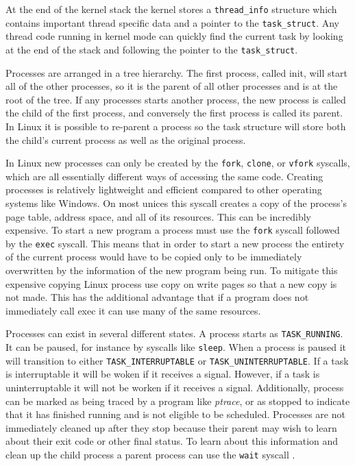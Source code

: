 \documentclass[10pt,conference,draftclsnofoot,onecolumn]{IEEEtran}
\begin{document}
At the end of the kernel stack the kernel stores a \texttt{thread\_info} structure which contains important thread specific data and a pointer to the \texttt{task\_struct}. Any thread code running in kernel mode can quickly find the current task by looking at the end of the stack and following the pointer to the \texttt{task\_struct}.

Processes are arranged in a tree hierarchy. The first process, called init, will start all of the other processes, so it is the parent of all other processes and is at the root of the tree. If any processes starts another process, the new process is called the child of the first process, and conversely the first process is called its parent. In Linux it is possible to re-parent a process so the task structure will store both the child's current process as well as the original process\cite{5_Torvalds_2016}.

In Linux new processes can only be created by the \texttt{fork}, \texttt{clone}, or \texttt{vfork} syscalls, which are all essentially different ways of accessing the same code. Creating processes is relatively lightweight and efficient compared to other operating systems like Windows. On most unices this syscall creates a copy of the process's page table, address space, and all of its resources. This can be incredibly expensive. To start a new program a process must use the \texttt{fork} syscall followed by the \texttt{exec} syscall. This means that in order to start a new process the entirety of the current process would have to be copied only to be immediately overwritten by the information of the new program being run. To mitigate this expensive copying Linux process use copy on write pages so that a new copy is not made. This has the additional advantage that if a program does not immediately call exec it can use many of the same resources.

Processes can exist in several different states. A process starts as \texttt{TASK\_RUNNING}. It can be paused, for instance by syscalls like \texttt{sleep}. When a process is paused it will transition to either \texttt{TASK\_INTERRUPTABLE} or \texttt{TASK\_UNINTERRUPTABLE}. If a task is interruptable it will be woken if it receives a signal. However, if a task is uninterruptable it will not be worken if it receives a signal. Additionally, process can be marked as being traced by a program like \textit{ptrace}, or as stopped to indicate that it has finished running and is not eligible to be scheduled. Processes are not immediately cleaned up after they stop because their parent may wish to learn about their exit code or other final status. To learn about this  information and clean up the child process a parent process can use the \texttt{wait} syscall \cite{1_love_2010}.
\end{document}
